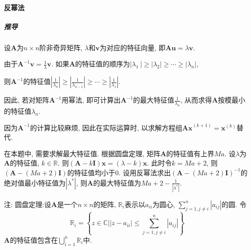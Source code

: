 \documentclass{article}
\begin{document}
\begin{CJK*}{UTF8}{song}
			\paragraph{反幂法}
				\subparagraph{推导}
					设$\mathbf{A}$为$n\times n$阶非奇异矩阵, $\lambda$和$\mathbf{v}$为对应的特征向量, 即$\mathbf{Au} = \lambda \mathbf{v}$.
					
					由于$\mathbf{A}^{-1}\mathbf{v} = \frac{1}{\lambda}\mathbf{v}$. 如果$\mathbf{A}$的特征值的顺序为$\left|\lambda_1\ \right| \geq \left|\lambda_2 \right| \geq \cdots \geq \left|\lambda_n \right|$,
					
					则$\mathbf{A}^{-1}$的特征值$\left|\frac{1}{\lambda_n}  \right|\geq \left|\frac{1}{\lambda_{n-1}} \right| \geq \cdots \geq \left|\frac{1}{\lambda_1} \right|$.
					
					因此, 若对矩阵$\mathbf{A}^{-1}$用幂法, 即可计算出$\mathbf{A}^{-1}$的最大特征值$\frac{1}{\lambda_n}$, 从而求得$\mathbf{A}$按模最小的特征值$\lambda_n$.
					
					因为$\mathbf{A}^{-1}$的计算比较麻烦, 因此在实际运算时, 以求解方程组$\mathbf{Ax}^{\left(k+1 \right)} = \mathbf{x}^{\left(k\right)}$替代.
					
					在本题中, 需要求解最大特征值. 根据圆盘定理, 矩阵$\textbf{A}$的特征值有上界$Ma$. 设$\lambda$为$\textbf{A}$的特征值, $k\in \mathbb{R}$. 则$\left(\mathbf{A}-k\mathbf{I}\right)\mathbf{x} = \left(\lambda - k\right) \mathbf{x}$. 此时令$k = Ma + 2$, 则$\left(\mathbf{A} - \left(Ma+2\right)\mathbf{I}\right)$的特征值均小于$0$. 设用反幂法求出$\left(\mathbf{A} - \left(Ma+2\right)\mathbf{I}\right)^{-1}$的绝对值最小特征值为$\left|\lambda^{*}\right|$, 则$\textbf{A}$的最大特征值为$Ma+2-\frac{1}{\left|\lambda^{*} \right|}$.
					
					注: 圆盘定理:设$\mathbf{A}$是一个$n\times n$的矩阵, $\mathbb{R}_i$表示以$a_{ii}$为圆心, $\sum_{j=1,j\neq i}^{n}\left|a_{ij} \right|$的圆. 
					令$$\mathbb{R}_i = \left\{z \in \mathbb{C}\bigg | \left|z-a_{ii} \right| \leq \sum_{j=1,j\neq i}^{n} \left|a_{ij} \right| \right\}$$
					$\mathbf{A}$的特征值包含在$\bigcup_{i=1}^n \mathbb{R}_i $中.
					

\end{CJK*}
\end{document}
